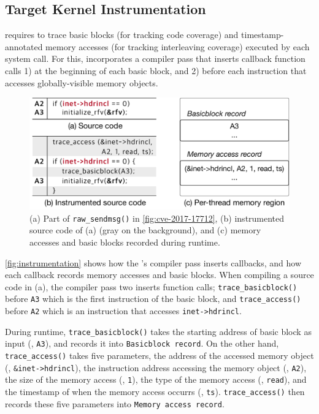 \subsection{Target Kernel Instrumentation}
\label{ss:instrumentation}

\sys requires to trace basic blocks (for tracking code coverage) and
timestamp-annotated memory accesses (for tracking interleaving
coverage) executed by each system call.
%
For this, \sys incorporates a compiler pass that inserts callback
function calls 1) at the beginning of each basic block, and 2) before
each instruction that accesses globally-visible memory objects.
%



\begin{figure}
  \centering
  \includegraphics[width=0.9\linewidth]{fig/instrumentation.pdf}
  \caption{(a) Part of \texttt{raw_sendmsg()} in
    \autoref{fig:cve-2017-17712}, (b) instrumented source code of (a)
    (gray on the background), and (c) memory accesses and basic blocks
    recorded during runtime.}
  \label{fig:instrumentation}
\end{figure}

\autoref{fig:instrumentation} shows how the \sys's compiler pass
inserts callbacks, and how each callback records memory accesses and
basic blocks.
%
When compiling a source code in (a), the compiler pass two inserts
function calls; \texttt{trace_basicblock()} before \texttt{A3} which
is the first instruction of the basic block, and
\texttt{trace_access()} before \texttt{A2} which is an instruction
that accesses \texttt{inet->hdrincl}.


During runtime, \texttt{trace_basicblock()} takes the starting address
of basic block as input (\ie, \texttt{A3}), and records it into
\texttt{Basicblock record}.
%
On the other hand, \texttt{trace_access()} takes five parameters, the
address of the accessed memory object (\ie, \texttt{\&inet->hdrincl}),
the instruction address accessing the memory object (\ie,
\texttt{A2}), the size of the memory access (\ie, \texttt{1}), the
type of the memory access (\ie, \texttt{read}), and the timestamp of
when the memory access occurrs (\ie, \texttt{ts}).
%
\texttt{trace_access()} then records these five parameters into
\texttt{Memory access record}.






